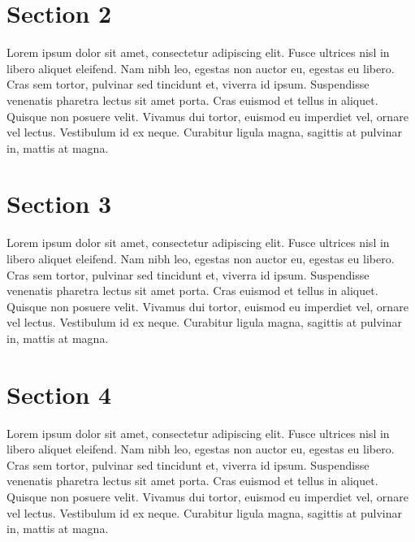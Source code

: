 \documentclass[a4paper, 12pt]{article}
\begin{document}

\section{Section 2}
\label{section-2}

Lorem ipsum dolor sit amet, consectetur adipiscing elit. Fusce ultrices nisl in libero aliquet eleifend. Nam nibh leo, egestas non auctor eu, egestas eu libero. Cras sem tortor, pulvinar sed tincidunt et, viverra id ipsum. Suspendisse venenatis pharetra lectus sit amet porta. Cras euismod et tellus in aliquet. Quisque non posuere velit. Vivamus dui tortor, euismod eu imperdiet vel, ornare vel lectus. Vestibulum id ex neque. Curabitur ligula magna, sagittis at pulvinar in, mattis at magna.


\section{Section 3}
\label{section-3}

Lorem ipsum dolor sit amet, consectetur adipiscing elit. Fusce ultrices nisl in libero aliquet eleifend. Nam nibh leo, egestas non auctor eu, egestas eu libero. Cras sem tortor, pulvinar sed tincidunt et, viverra id ipsum. Suspendisse venenatis pharetra lectus sit amet porta. Cras euismod et tellus in aliquet. Quisque non posuere velit. Vivamus dui tortor, euismod eu imperdiet vel, ornare vel lectus. Vestibulum id ex neque. Curabitur ligula magna, sagittis at pulvinar in, mattis at magna.


\section{Section 4}
\label{section-4}

Lorem ipsum dolor sit amet, consectetur adipiscing elit. Fusce ultrices nisl in libero aliquet eleifend. Nam nibh leo, egestas non auctor eu, egestas eu libero. Cras sem tortor, pulvinar sed tincidunt et, viverra id ipsum. Suspendisse venenatis pharetra lectus sit amet porta. Cras euismod et tellus in aliquet. Quisque non posuere velit. Vivamus dui tortor, euismod eu imperdiet vel, ornare vel lectus. Vestibulum id ex neque. Curabitur ligula magna, sagittis at pulvinar in, mattis at magna.






\nocite{*}
\end{document}
